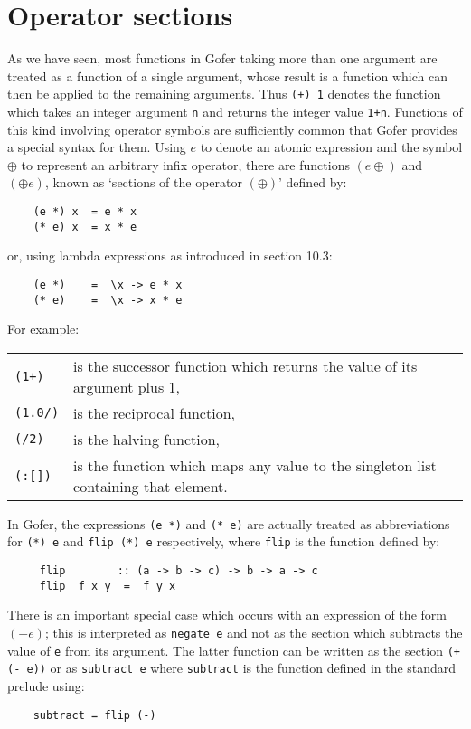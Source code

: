 \section{Operator sections}
As we have seen, most functions in Gofer taking more than one  argument
are treated as a function of a  single  argument,  whose  result  is  a
function which can then be applied to the  remaining  arguments.   Thus
\verb"(+) 1" denotes the function which takes an integer  
argument  \verb"n"  and
returns the integer value \verb"1+n".   Functions  of  this  kind  involving
operator symbols are sufficiently common that Gofer provides a  special
syntax for them.  Using $e$ to denote an atomic expression and the symbol
$\oplus$ to represent an arbitrary infix operator, there are functions 
$(e\oplus)$
and $(\oplus e)$, known as `sections of the operator $(\oplus)$' defined by:
\begin{verbatim}
    (e *) x  = e * x
    (* e) x  = x * e
\end{verbatim}
or, using lambda expressions as introduced in section 10.3:
\begin{verbatim}
    (e *)    =  \x -> e * x
    (* e)    =  \x -> x * e
\end{verbatim}
For example:
\BQ
\begin{tabular}{lp{8cm}}
       \verb"(1+)"&   is the successor function which returns the value
                    of its argument plus 1,\\
       \verb"(1.0/)"& is the reciprocal function,\\
       \verb"(/2)"&   is the halving function,\\
       \verb"(:[])"&  is the function which maps any value to the
                    singleton list containing that element.
\end{tabular}
\EQ

In Gofer, the expressions \verb"(e *)" and \verb"(* e)" 
are actually  treated  as
abbreviations for \verb"(*) e" and \verb"flip (*) e" respectively,  
where  \verb"flip"
is the function defined by:
\begin{verbatim}
     flip        :: (a -> b -> c) -> b -> a -> c
     flip  f x y  =  f y x
\end{verbatim}
There is an important special case which occurs with an  expression  of
the form $(- e)$; this is interpreted  as  \verb"negate e"  and  not  as  the
section which subtracts the value of \verb"e" from its argument.  The latter
function can be written as the section \verb"(+ (- e))"  or  as  
\verb"subtract e"
where \verb"subtract" is the function defined in the standard prelude using:
\begin{verbatim}
    subtract = flip (-)
\end{verbatim}

